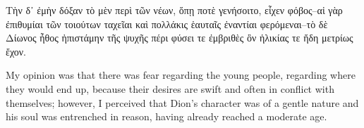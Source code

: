 \documentclass[12pt]{book}
\begin{document}
\begin{pairs}
\begin{Rightside}
\begin{Ancient Greek}
\beginnumbering
\pstart
Τὴν δ᾽ ἐμὴν δόξαν τὸ μὲν περὶ τῶν νέων, ὅπῃ ποτὲ γενήσοιτο, εἶχεν φόβος--αἱ γὰρ ἐπιθυμίαι τῶν τοιούτων ταχεῖαι καὶ πολλάκις ἑαυταῖς ἐναντίαι φερόμεναι--τὸ δὲ Δίωνος ἦθος ἠπιστάμην τῆς ψυχῆς πέρι φύσει τε ἐμβριθὲς ὂν ἡλικίας τε ἤδη μετρίως ἔχον.
\pend
\endnumbering
\end{Ancient Greek}
\end{Rightside}
\begin{Leftside}
\begin{English}
\beginnumbering
\pstart
My opinion was that there was fear regarding the young people, regarding where they would end up, because their desires are swift and often in conflict with themselves; however, I perceived that Dion's character was of a gentle nature and his soul was entrenched in reason, having already reached a moderate age.
\pend
\endnumbering
\end{English}
\end{Leftside}
\end{pairs}
\Columns
\end{document}

